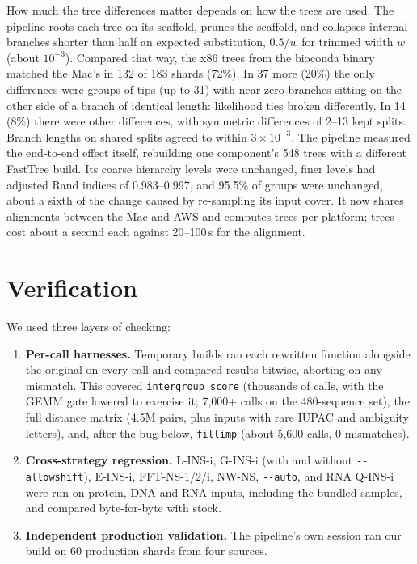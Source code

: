 \documentclass[11pt]{article}
\newcommand{\code}[1]{\texttt{#1}}
\begin{document}
How much the tree differences matter depends on how the trees are used. The pipeline roots each
tree on its scaffold, prunes the scaffold, and collapses internal branches shorter than half
an expected substitution, $0.5/w$ for trimmed width $w$ (about $10^{-3}$). Compared that way,
the x86 trees from the bioconda binary matched the Mac's in 132 of 183 shards (72\%). In 37
more (20\%) the only differences were groups of tips (up to 31) with near-zero branches
sitting on the other side of a branch of identical length: likelihood ties broken
differently. In 14 (8\%) there were other differences, with symmetric differences of 2--13
kept splits. Branch lengths on shared splits agreed to within $3\times10^{-3}$. The pipeline
measured the end-to-end effect itself, rebuilding one component's 548 trees with a different
FastTree build. Its coarse hierarchy levels were unchanged, finer levels had adjusted Rand
indices of 0.983--0.997, and 95.5\% of groups were unchanged, about a sixth of the change
caused by re-sampling its input cover. It now shares alignments between the Mac and AWS and
computes trees per platform; trees cost about a second each against 20--100\,s for the alignment.

\section{Verification}
\label{sec:verify}

We used three layers of checking:
\begin{enumerate}
\item \textbf{Per-call harnesses.} Temporary builds ran each rewritten function alongside
  the original on every call and compared results bitwise, aborting on any mismatch. This
  covered \code{intergroup\_score} (thousands of calls, with the GEMM gate lowered to
  exercise it; 7{,}000+ calls on the 480-sequence set), the full distance matrix
  (4.5M pairs, plus inputs with rare IUPAC and ambiguity letters), and, after the bug
  below, \code{fillimp} (about 5{,}600 calls, 0 mismatches).
\item \textbf{Cross-strategy regression.} L-INS-i, G-INS-i (with and without
  \code{-{}-allowshift}), E-INS-i, FFT-NS-1/2/i, NW-NS, \code{-{}-auto}, and RNA Q-INS-i were
  run on protein, DNA and RNA inputs, including the bundled samples, and compared
  byte-for-byte with stock.
\item \textbf{Independent production validation.} The pipeline's own session ran our build
  on 60 production shards from four sources.
\end{enumerate}
\end{document}
